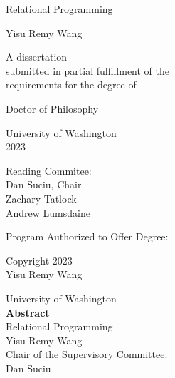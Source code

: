 \documentclass[12pt]{book}
\title{\mytitle}
\author{\myauthor}
\def\mytitle{Relational Programming}
\def\myauthor{Yisu Remy Wang}
\def\year{2023}
\begin{document}
\pagestyle{empty}

\begin{center}
  {\huge \mytitle}
  \vfill

  {\Large \myauthor}
  \vfill

  \begin{spacing}{1}
    A dissertation \\
    submitted in partial fulfillment of the \\
    requirements for the degree of
  \end{spacing}
  \vfill

  Doctor of Philosophy
  \vfill

  University of Washington \\
  \year
  \vfill

  Reading Commitee: \\
  Dan Suciu, Chair \\
  Zachary Tatlock \\
  Andrew Lumsdaine
  \vfill
  \begin{spacing}{1}
    Program Authorized to Offer Degree: \\
    \cse
  \end{spacing}
  \clearpage

  \textcopyright{} Copyright \year\\
  \myauthor
  \clearpage
\end{center}

\pagestyle{plain}
\setcounter{page}{1}

\begin{center}
  University of Washington \\[1em]
  \textbf{Abstract}        \\[1em]
  \mytitle                 \\[1em]
  \myauthor                \\[1em]

  Chair of the Supervisory Committee: \\[-0.5em]
  Dan Suciu \\[-0.5em]
  \pgas
  \\[2em]
\end{center}


\begin{spacing}{1.5}
  \tableofcontents
\end{spacing}
\end{document}
